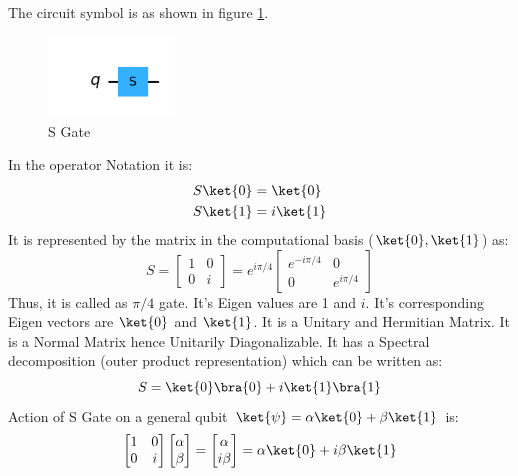 \documentclass[12pt, oneside]{book}
\theoremstyle{definition}
\theoremstyle{definition}
\theoremstyle{remark}
\begin{document}
The circuit symbol is as shown in figure \ref{fig:s}.
\begin{figure}[H]
    \centering
    \includegraphics[width=0.3\textwidth]{../images/s-gate.png}
    \caption{S Gate}
    \label{fig:s}
\end{figure}
In the operator Notation it is:
\begin{align*}
    S\ket{0}&=\ket{0} \\
    S\ket{1}&=i\ket{1}
\end{align*}
It is represented by the matrix in the computational basis ($\ket{0},\ket{1}$) as:
\[
    S=\begin{bmatrix}
        1 & 0 \\
        0 & i
    \end{bmatrix}=e^{i\pi/4}\begin{bmatrix}
        e^{-i\pi/4} & 0 \\
        0 & e^{i\pi/4}
    \end{bmatrix}
\]
Thus, it is called as $\pi/4$ gate.
It's Eigen values are 1 and $i$. It's corresponding Eigen vectors are $\ket{0}$ and $\ket{1}$.
It is a Unitary and Hermitian Matrix. It is a Normal Matrix hence Unitarily Diagonalizable.
It has a Spectral decomposition (outer product representation) which can be written as:
\[
    S=\ket{0}\bra{0}+i\ket{1}\bra{1}
\]
Action of S Gate on a general qubit $\ket{\psi}=\alpha\ket{0}+\beta\ket{1}$ is:
\[
    \begin{bmatrix}
        1 & 0 \\
        0 & i
    \end{bmatrix}\begin{bmatrix}
        \alpha \\
        \beta
    \end{bmatrix}=\begin{bmatrix}
        \alpha \\
        i\beta
    \end{bmatrix}=\alpha\ket{0}+i\beta\ket{1}
\]
\end{document}
